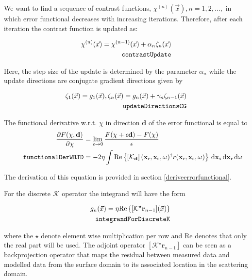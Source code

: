 \documentclass[10pt,a4paper]{article}
\newcommand{\partder}[2]{\ensuremath{\frac{\partial #1}{\partial #2}}}
\newcommand{\df}[1]{\, \ensuremath{\mbox{d}#1}}
\newcommand{\real}[1]{\text{Re} \left\{ #1 \right\}}
\newcommand{\xs}{\mathbf{x}_\text{s}}
\newcommand{\xr}{\mathbf{x}_\text{r}}
\begin{document}
We want to find a sequence of contrast functions,
$\chi^{(n)}(\vec{x}), n = 1,2,...,$ in which error functional
decreases with increasing iterations. Therefore, after each iteration
the contrast function is updated as:

\begin{align} \label{eq:contrastUpdate} \chi^{(n)}(\vec{x}) =
\chi^{(n-1)}(\vec{x}) + \alpha_n\zeta_n(\vec{x})\\
\tag*{\texttt{contrastUpdate}}
\end{align}

Here, the step size of the update is determined by the parameter
$\alpha_n$ while the update directions are conjugate gradient
directions given by

\begin{align} \label{eq:updateDirectionsCG}\zeta_1(\vec{x}) = g_1(\vec{x})
,\zeta_n(\vec{x}) = g_n(\vec{x}) + \gamma_n\zeta_{n-1}(\vec{x})\\
\tag*{\texttt{updateDirectionsCG}}
\end{align}

The functional derivative w.r.t. $\chi$ in direction $\mathbf{d}$ of
the error functional is equal to
\begin{align}
\label{eq:functionalDerWRTD}
\partder{F(\mathbf{\chi}, \mathbf{d})}{\mathbf{\chi}} & =
\lim_{\epsilon \rightarrow 0} \frac{F(\mathbf{\chi} + \epsilon
\mathbf{d}) - F(\mathbf{\chi})}{\epsilon} \\
\tag*{\texttt{functionalDerWRTD}}
& = -2 \eta \int \real{\left[\mathcal{K}_\mathbf{d} \right](\xr, \xs,
\omega)^{\dagger} r (\xr, \xs, \omega)} \df{\xs} \df{\xr} \df{\omega}
\end{align}

The derivation of this equation is provided in section
\ref{deriveerrorfunctional}.

For the discrete $\mathcal{K}$ operator the integrand will have the form

\begin{align} \label{eq:integrandForDiscreteK} g_n(\vec{x}) = \eta
\real{[\mathcal{K}^\star\mathbf{r}_{n-1}](\vec{x})}\\
\tag*{\texttt{integrandForDiscreteK}}
\end{align}

where the $\star$ denote element wise multiplication per row and Re
denotes that only the real part will be used.
The adjoint operator $[\mathcal{K}^\star\mathbf{r}_{n-1}]$ can be seen
as a backprojection operator that maps the residual between measured
data and modelled data from the surface domain to its associated
location in the scattering domain.
\end{document}

